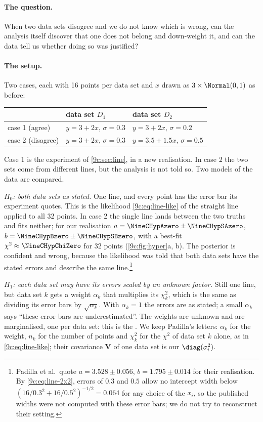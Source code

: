 \paragraph{The question.} When two data sets disagree and we do not know which is wrong, can the analysis
itself discover that one does not belong and down-weight it, and can the data tell us whether doing so was
justified?

\paragraph{The setup.} Two cases, each with 16 points per data set and $x$ drawn as $3\times\Normal(0,1)$ as
before:
\begin{center}
\small
\renewcommand{\arraystretch}{1.15}
\begin{tabular}{@{}lll@{}}
\toprule
 & data set $D_1$ & data set $D_2$\\\midrule
case 1 (agree) & $y=3+2x$, $\sigma=0.3$ & $y=3+2x$, $\sigma=0.2$\\
case 2 (disagree) & $y=3+2x$, $\sigma=0.3$ & $y=3.5+1.5x$, $\sigma=0.5$\\
\bottomrule
\end{tabular}
\end{center}
Case 1 is the experiment of \cref{9c:sec:line}, in a new realisation. In case 2 the two sets come from different lines, but the analysis
is not told so. Two models of the data are compared.

\emph{$H_0$: both data sets as stated.} One line, and every point has the error bar its experiment quotes.
This is the likelihood \eqref{9c:eq:line-like} of the straight line applied to all 32 points. In case 2 the
single line lands between the two truths and fits neither; for our realisation
$a=\NineCHypAzero\pm\NineCHypSAzero$, $b=\NineCHypBzero\pm\NineCHypSBzero$, with a best-fit
$\chi^2\approx\NineCHypChiZero$ for 32 points (\cref{9c:fig:hyper}a, b). The posterior is confident and
wrong, because the likelihood was told that both data sets have the stated errors and describe the
same line.\footnote{Padilla et al.\ quote $a=3.528\pm0.056$, $b=1.795\pm0.014$ for their realisation.
By \eqref{9c:eq:line-2x2}, errors of $0.3$ and $0.5$ allow no intercept width below
$(16/0.3^2+16/0.5^2)^{-1/2}=0.064$ for any choice of the $x_i$, so the published widths were not
computed with these error bars; we do not try to reconstruct their setting.}

\emph{$H_1$: each data set may have its errors scaled by an unknown factor.} Still one line, but data set
$k$ gets a weight $\alpha_k$ that multiplies its $\chi^2_k$, which is the same as dividing its error bars by
$\sqrt{\alpha_k}$. With $\alpha_k=1$ the errors are as stated; a small $\alpha_k$ says ``these error bars are
underestimated''. The weights are unknown and are marginalised, one per data set: this is the
 . We keep
Padilla's letters: $\alpha_k$ for the weight, $n_k$ for the number of points and $\chi^2_k$ for the
$\chi^2$ of data set $k$ alone, as in \eqref{9c:eq:line-like}; their covariance $\mathbf V$ of one data set is
our $\diag(\sigma_i^2)$.

